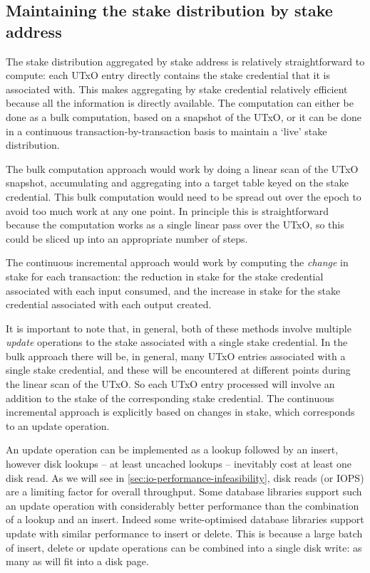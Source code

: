 \documentclass[11pt,a4paper]{article}
\begin{document}
\subsection{Maintaining the stake distribution by stake address}
\label{sec:maintaining-the-stake-distribution-by-stake-address}

The stake distribution aggregated by stake address is relatively
straightforward to compute: each UTxO entry directly contains the stake
credential that it is associated with. This makes aggregating by stake
credential relatively efficient because all the information is directly
available. The computation can either be done as a bulk computation, based on
a snapshot of the UTxO, or it can be done in a continuous
transaction-by-transaction basis to maintain a `live' stake distribution.

The bulk computation approach would work by doing a linear scan of the UTxO
snapshot, accumulating and aggregating into a target table keyed on the stake
credential. This bulk computation would need to be spread out over the epoch
to avoid too much work at any one point. In principle this is straightforward
because the computation works as a single linear pass over the UTxO, so this
could be sliced up into an appropriate number of steps.

The continuous incremental approach would work by computing the \emph{change}
in stake for each transaction: the reduction in stake for the stake credential
associated with each input consumed, and the increase in stake for the stake
credential associated with each output created.

It is important to note that, in general, both of these methods involve
multiple \emph{update} operations to the stake associated with a single stake
credential. In the bulk approach there will be, in general, many UTxO entries
associated with a single stake credential, and these will be encountered at
different points during the linear scan of the UTxO. So each UTxO entry
processed will involve an addition to the stake of the corresponding stake
credential. The continuous incremental approach is explicitly based on changes
in stake, which corresponds to an update operation.

An update operation can be implemented as a lookup followed by an insert,
however disk lookups -- at least uncached lookups -- inevitably cost at least
one disk read. As we will see in \cref{sec:io-performance-infeasibility}, disk
reads (or IOPS) are a limiting factor for overall throughput. Some database
libraries support such an update operation with considerably better performance
than the combination of a lookup and an insert. Indeed some write-optimised
database libraries support update with similar performance to insert or delete.
This is because a large batch of insert, delete or update operations can be
combined into a single disk write: as many as will fit into a disk page.
\end{document}
